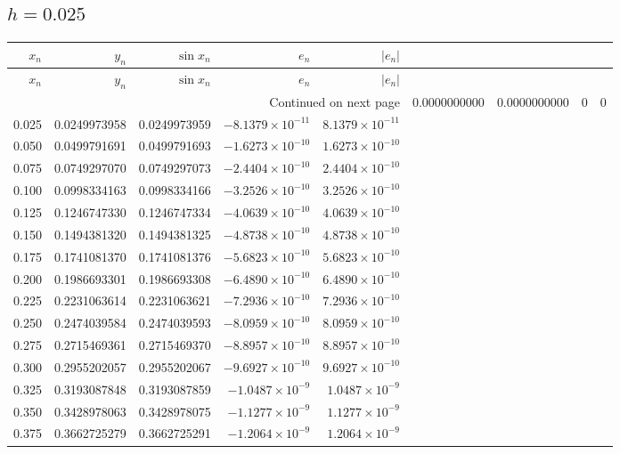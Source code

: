 \documentclass[11pt,a4paper]{article}
\begin{document}
\subsection{\texorpdfstring{$h=0.025$}{h=0.025}}
\begingroup\footnotesize\setlength{\tabcolsep}{5pt}
\begin{longtable}{rrrrr}
\toprule $x_n$ & $y_n$ & $\sin x_n$ & $e_n$ & $|e_n|$ \\ \midrule
\endfirsthead
\toprule $x_n$ & $y_n$ & $\sin x_n$ & $e_n$ & $|e_n|$ \\ \midrule
\endhead\midrule\multicolumn{5}{r}{Continued on next page}\endfoot\bottomrule\endlastfoot
0.000 & 0.0000000000 & 0.0000000000 & $0$ & $0$ \\
0.025 & 0.0249973958 & 0.0249973959 & $-8.1379\times 10^{-11}$ & $8.1379\times 10^{-11}$ \\
0.050 & 0.0499791691 & 0.0499791693 & $-1.6273\times 10^{-10}$ & $1.6273\times 10^{-10}$ \\
0.075 & 0.0749297070 & 0.0749297073 & $-2.4404\times 10^{-10}$ & $2.4404\times 10^{-10}$ \\
0.100 & 0.0998334163 & 0.0998334166 & $-3.2526\times 10^{-10}$ & $3.2526\times 10^{-10}$ \\
0.125 & 0.1246747330 & 0.1246747334 & $-4.0639\times 10^{-10}$ & $4.0639\times 10^{-10}$ \\
0.150 & 0.1494381320 & 0.1494381325 & $-4.8738\times 10^{-10}$ & $4.8738\times 10^{-10}$ \\
0.175 & 0.1741081370 & 0.1741081376 & $-5.6823\times 10^{-10}$ & $5.6823\times 10^{-10}$ \\
0.200 & 0.1986693301 & 0.1986693308 & $-6.4890\times 10^{-10}$ & $6.4890\times 10^{-10}$ \\
0.225 & 0.2231063614 & 0.2231063621 & $-7.2936\times 10^{-10}$ & $7.2936\times 10^{-10}$ \\
0.250 & 0.2474039584 & 0.2474039593 & $-8.0959\times 10^{-10}$ & $8.0959\times 10^{-10}$ \\
0.275 & 0.2715469361 & 0.2715469370 & $-8.8957\times 10^{-10}$ & $8.8957\times 10^{-10}$ \\
0.300 & 0.2955202057 & 0.2955202067 & $-9.6927\times 10^{-10}$ & $9.6927\times 10^{-10}$ \\
0.325 & 0.3193087848 & 0.3193087859 & $-1.0487\times 10^{-9}$ & $1.0487\times 10^{-9}$ \\
0.350 & 0.3428978063 & 0.3428978075 & $-1.1277\times 10^{-9}$ & $1.1277\times 10^{-9}$ \\
0.375 & 0.3662725279 & 0.3662725291 & $-1.2064\times 10^{-9}$ & $1.2064\times 10^{-9}$ \\

\end{longtable}
\end{document}
